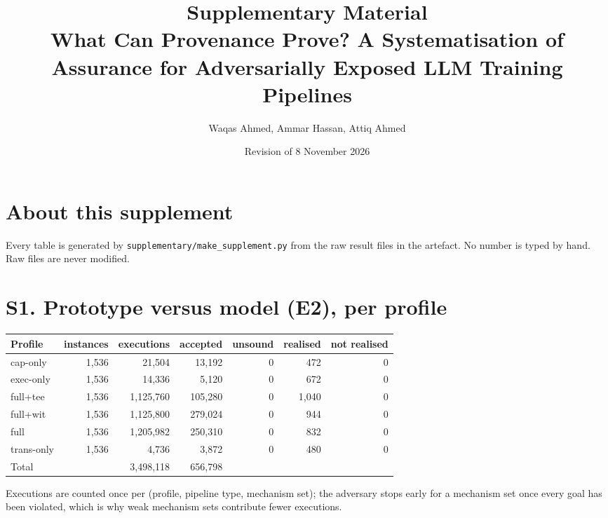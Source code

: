 \documentclass[10pt,a4paper]{article}
\title{Supplementary Material\\\large What Can Provenance Prove? A Systematisation of Assurance for Adversarially Exposed LLM Training Pipelines}
\author{Waqas Ahmed, Ammar Hassan, Attiq Ahmed}\date{Revision of 8 November 2026}
\begin{document}
\maketitle\tableofcontents
\section*{About this supplement}
Every table is generated by \texttt{supplementary/make\_supplement.py} from the raw result files in the artefact.
No number is typed by hand. Raw files are never modified.

\section{S1. Prototype versus model (E2), per profile}
\begin{tabular}{lrrrrrr}\toprule Profile & instances & executions & accepted & unsound & realised & not realised\\\midrule
cap-only & 1,536 & 21,504 & 13,192 & 0 & 472 & 0\\
exec-only & 1,536 & 14,336 & 5,120 & 0 & 672 & 0\\
full+tee & 1,536 & 1,125,760 & 105,280 & 0 & 1,040 & 0\\
full+wit & 1,536 & 1,125,800 & 279,024 & 0 & 944 & 0\\
full & 1,536 & 1,205,982 & 250,310 & 0 & 832 & 0\\
trans-only & 1,536 & 4,736 & 3,872 & 0 & 480 & 0\\
\midrule Total & & 3,498,118 & 656,798 & & & \\\bottomrule\end{tabular}
\par\smallskip Executions are counted once per (profile, pipeline type, mechanism set); the adversary stops early for a mechanism set once every goal has been violated, which is why weak mechanism sets contribute fewer executions.
\end{document}
